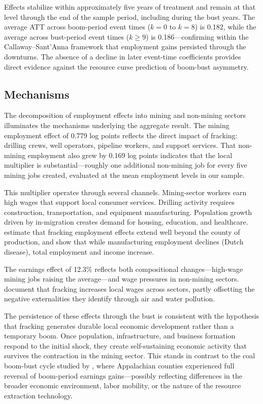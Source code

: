 \documentclass[12pt]{article}
\begin{document}
Effects stabilize within approximately five years of treatment and remain at that level through the end of the sample period, including during the bust years. The average ATT across boom-period event times ($k = 0$ to $k = 8$) is 0.182, while the average across bust-period event times ($k \geq 9$) is 0.186---confirming within the Callaway--Sant'Anna framework that employment gains persisted through the downturns. The absence of a decline in later event-time coefficients provides direct evidence against the resource curse prediction of boom-bust asymmetry.



\subsection{Mechanisms}

The decomposition of employment effects into mining and non-mining sectors illuminates the mechanisms underlying the aggregate result. The mining employment effect of 0.779 log points reflects the direct impact of fracking: drilling crews, well operators, pipeline workers, and support services. That non-mining employment also grew by 0.169 log points indicates that the local multiplier is substantial---roughly one additional non-mining job for every five mining jobs created, evaluated at the mean employment levels in our sample.

This multiplier operates through several channels. Mining-sector workers earn high wages that support local consumer services. Drilling activity requires construction, transportation, and equipment manufacturing. Population growth driven by in-migration creates demand for housing, education, and healthcare. \citet{feyrer2017geographic} estimate that fracking employment effects extend well beyond the county of production, and \citet{allcott2018dutch} show that while manufacturing employment declines (Dutch disease), total employment and income increase.

The earnings effect of 12.3\% reflects both compositional changes---high-wage mining jobs raising the average---and wage pressures in non-mining sectors. \citet{bartik2019externalities} document that fracking increases local wages across sectors, partly offsetting the negative externalities they identify through air and water pollution.

The persistence of these effects through the bust is consistent with the hypothesis that fracking generates durable local economic development rather than a temporary boom. Once population, infrastructure, and business formation respond to the initial shock, they create self-sustaining economic activity that survives the contraction in the mining sector. This stands in contrast to the coal boom-bust cycle studied by \citet{black2005boom}, where Appalachian counties experienced full reversal of boom-period earnings gains---possibly reflecting differences in the broader economic environment, labor mobility, or the nature of the resource extraction technology.
\end{document}
